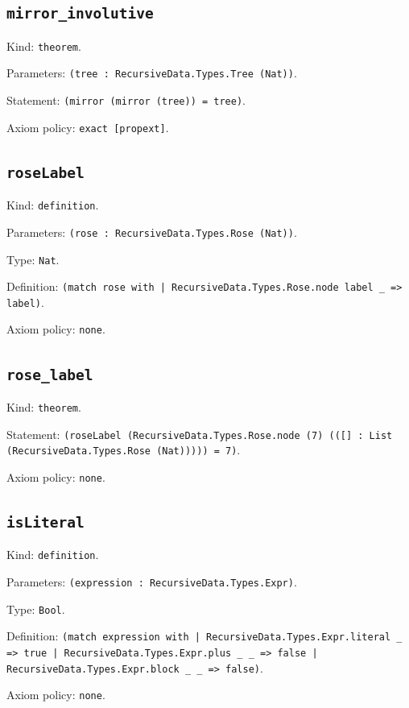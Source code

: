 \documentclass[11pt]{article}
\begin{document}
\subsection*{\texttt{mirror\_involutive}}
\noindent Kind: \texttt{theorem}.\par
\noindent Parameters: \texttt{(tree : RecursiveData.Types.Tree (Nat))}.\par
\noindent Statement: \texttt{(mirror (mirror (tree)) = tree)}.\par
\noindent Axiom policy: \texttt{exact [propext]}.\par
\subsection*{\texttt{roseLabel}}
\noindent Kind: \texttt{definition}.\par
\noindent Parameters: \texttt{(rose : RecursiveData.Types.Rose (Nat))}.\par
\noindent Type: \texttt{Nat}.\par
\noindent Definition: \texttt{(match rose with | RecursiveData.Types.Rose.node label \_ => label)}.\par
\noindent Axiom policy: \texttt{none}.\par
\subsection*{\texttt{rose\_label}}
\noindent Kind: \texttt{theorem}.\par
\noindent Statement: \texttt{(roseLabel (RecursiveData.Types.Rose.node (7) (([] : List (RecursiveData.Types.Rose (Nat))))) = 7)}.\par
\noindent Axiom policy: \texttt{none}.\par
\subsection*{\texttt{isLiteral}}
\noindent Kind: \texttt{definition}.\par
\noindent Parameters: \texttt{(expression : RecursiveData.Types.Expr)}.\par
\noindent Type: \texttt{Bool}.\par
\noindent Definition: \texttt{(match expression with | RecursiveData.Types.Expr.literal \_ => true | RecursiveData.Types.Expr.plus \_ \_ => false | RecursiveData.Types.Expr.block \_ \_ => false)}.\par
\noindent Axiom policy: \texttt{none}.\par
\end{document}
